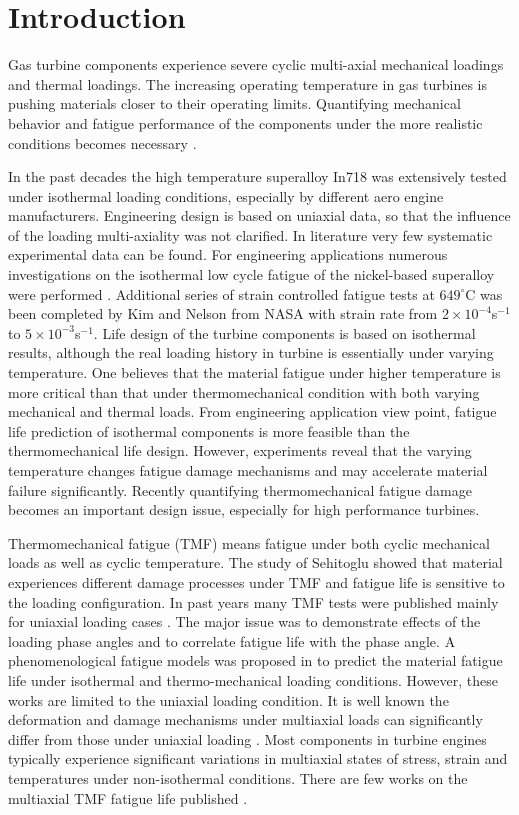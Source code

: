 \documentclass[preprint,5p,twocolumn,11pt,sort&compress]{elsarticle}
\begin{document}
\section{Introduction}
Gas turbine components experience severe cyclic multi-axial mechanical loadings and thermal loadings. The increasing operating temperature in gas turbines is pushing materials closer to their operating limits. Quantifying mechanical behavior and fatigue performance of the components under the more realistic conditions becomes necessary \cite{Harrison1996}.

In the past decades the high temperature superalloy In718 was extensively tested under isothermal loading conditions, especially by different aero engine manufacturers. Engineering design is based on uniaxial data, so that the influence of the loading multi-axiality was not clarified. In literature very few systematic experimental data can be found. For engineering applications numerous investigations on the isothermal low cycle fatigue of the nickel-based superalloy were performed \cite{Mahobia2014, Chen2016, William1995}. Additional series of strain controlled fatigue tests at $649^\circ$C was been completed by Kim \cite{kim1988elevated} and Nelson \cite{nelson1992creep} from NASA with strain rate from $2\times10^{-4}$s$^{-1}$ to $5\times10^{-3}$s$^{-1}$.
Life design of the turbine components is based on isothermal results, although the real loading history in turbine is essentially under varying temperature. One believes that the material fatigue under higher temperature is more critical than that under thermomechanical condition with both varying mechanical and thermal loads. From engineering application view point, fatigue life prediction of isothermal components is more feasible than the thermomechanical life design. However, experiments reveal that the varying temperature changes fatigue damage mechanisms and may accelerate material failure significantly. Recently quantifying thermomechanical fatigue damage becomes an important design issue, especially for high performance turbines.

Thermomechanical fatigue (TMF) means fatigue under both cyclic mechanical loads as well as cyclic temperature. The study of Sehitoglu showed that material experiences different damage processes under TMF and fatigue life is sensitive to the loading configuration. In past years many TMF tests were published mainly for uniaxial loading cases \cite{Evans2008, Kulawinski2015, Remy2003, Bauer2009}. The major issue was to demonstrate effects of the loading phase angles and to correlate fatigue life with the phase angle. A phenomenological fatigue models was proposed  in \cite{Vose2013} to predict the material fatigue life under isothermal and thermo-mechanical loading conditions. However, these works are limited to the uniaxial loading condition. It is well known the deformation and damage mechanisms under multiaxial loads can significantly differ from those under uniaxial loading \cite{Fang2015, Kang2004, Chen2004}. Most components in turbine engines typically experience significant variations in multiaxial states of stress, strain and temperatures under non-isothermal conditions. There are few works on the multiaxial TMF fatigue life published \cite{Brookes2010}.
\end{document}
